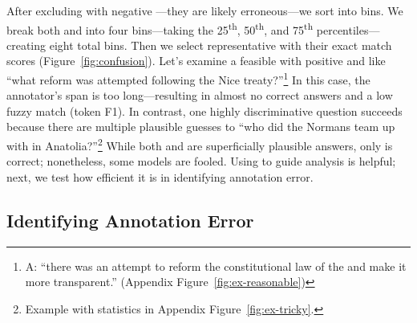 After excluding \itms{} with negative \discability{}---they are
likely erroneous---we sort \itms{} into bins.
%
We break both \diff{} and \discability{} into four bins---taking the 25\textsuperscript{th},
50\textsuperscript{th}, and 75\textsuperscript{th}
percentiles---creating eight total bins.
%
Then we select representative \squad{} \subjs{} with their
exact match scores (Figure~\ref{fig:confusion}).
%
Let's examine a feasible \itm{} with positive \diff{} and \discability{} like ``what reform was attempted following the Nice treaty?''\footnote{
    A: ``there was an attempt to reform the constitutional law of the  and make it more transparent.'' (Appendix Figure~\ref{fig:ex-reasonable})
}
In this case, the annotator's span is too long---resulting in almost
no correct answers and a low fuzzy match (token F1).
%
In contrast, one highly discriminative question succeeds because there
are multiple plausible guesses to ``who did the Normans team up with
in Anatolia?''\footnote{ Example with statistics in Appendix
    Figure~\ref{fig:ex-tricky}.
}
While both  and  are
superficially plausible answers, only  is correct;
nonetheless, some models are fooled.
%
Using \irt{} to guide \subj{} analysis is helpful; next, we test how
efficient it is in identifying annotation error.

\subsection{Identifying Annotation Error}

